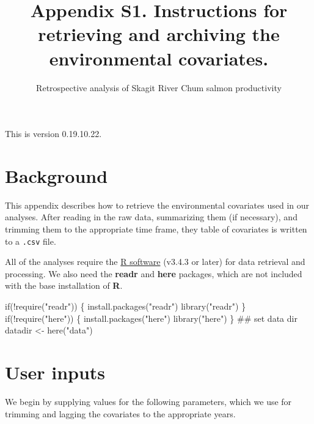 \documentclass[11pt,]{article}
\title{Appendix S1. Instructions for retrieving and archiving the environmental
covariates.}
\subtitle{Retrospective analysis of Skagit River Chum salmon productivity}
\author{}
\date{}
\newenvironment{Shaded}{}{}
\newcommand{\KeywordTok}[1]{\textcolor[rgb]{0.00,0.00,1.00}{#1}}
\newcommand{\StringTok}[1]{\textcolor[rgb]{0.00,0.50,0.50}{#1}}
\newcommand{\ControlFlowTok}[1]{\textcolor[rgb]{0.00,0.00,1.00}{#1}}
\newcommand{\OperatorTok}[1]{#1}
\newcommand{\NormalTok}[1]{#1}
\begin{document}
\maketitle

{
\setcounter{tocdepth}{2}
\tableofcontents
}
\vspace{0.2in}

This is version 0.19.10.22.

\section{Background}\label{background}

This appendix describes how to retrieve the environmental covariates
used in our analyses. After reading in the raw data, summarizing them
(if necessary), and trimming them to the appropriate time frame, they
table of covariates is written to a \texttt{.csv} file.

All of the analyses require the \href{https://cran.r-project.org/}{R
software} (v3.4.3 or later) for data retrieval and processing. We also
need the \textbf{readr} and \textbf{here} packages, which are not
included with the base installation of \textbf{R}.

\begin{Shaded}
\begin{Highlighting}[]
\ControlFlowTok{if}\NormalTok{(}\OperatorTok{!}\KeywordTok{require}\NormalTok{(}\StringTok{"readr"}\NormalTok{)) \{}
  \KeywordTok{install.packages}\NormalTok{(}\StringTok{"readr"}\NormalTok{)}
  \KeywordTok{library}\NormalTok{(}\StringTok{"readr"}\NormalTok{)}
\NormalTok{\}}
\ControlFlowTok{if}\NormalTok{(}\OperatorTok{!}\KeywordTok{require}\NormalTok{(}\StringTok{"here"}\NormalTok{)) \{}
  \KeywordTok{install.packages}\NormalTok{(}\StringTok{"here"}\NormalTok{)}
  \KeywordTok{library}\NormalTok{(}\StringTok{"here"}\NormalTok{)}
\NormalTok{\}}
\NormalTok{## set data dir}
\NormalTok{datadir <-}\StringTok{ }\KeywordTok{here}\NormalTok{(}\StringTok{"data"}\NormalTok{)}
\end{Highlighting}
\end{Shaded}

\section{User inputs}\label{user-inputs}

We begin by supplying values for the following parameters, which we use
for trimming and lagging the covariates to the appropriate years.
\end{document}
